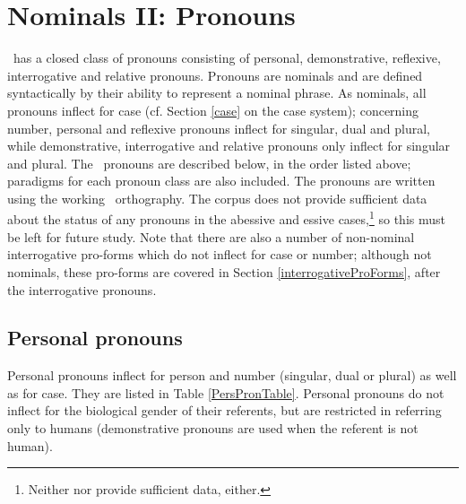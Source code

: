 

\chapter{Nominals II: Pronouns}\label{pronouns}
\PS\ has a closed class of pronouns consisting of personal, demonstrative, reflexive, interrogative and relative pronouns. Pronouns are nominals and are defined syntactically by their ability to represent a nominal phrase. 
As nominals, all pronouns inflect for case (cf. Section \ref{case} on the case system); concerning number, personal and reflexive pronouns inflect for singular, dual and plural, while demonstrative, interrogative and relative pronouns only inflect for singular and plural. 
The \PS\ pronouns are described below, in the order listed above; paradigms for each pronoun class are also included. The pronouns are written using the working \PS\ orthography. The corpus does not provide sufficient data about the status of any pronouns in the abessive and essive cases,\footnote{Neither \citet{Lagercrantz1926} nor \citet{Lehtiranta1992} provide sufficient data, either.} 
so this must be left for future study. 
Note that there are also a number of non-nominal interrogative pro-forms which do not inflect for case or number; although not nominals, these pro-forms are covered in Section \ref{interrogativeProForms}, after the interrogative pronouns. 


\section{Personal pronouns}\label{personalPronouns}
Personal pronouns inflect for person and number (singular, dual or plural) as well as for case. They are listed in Table \vref{PersPronTable}. Personal pronouns do not inflect for the biological gender of their referents, but are restricted in referring only to humans (demonstrative pronouns are used when the referent is not human).

